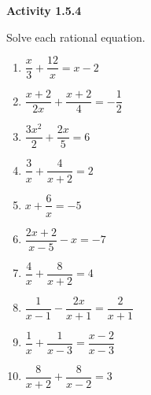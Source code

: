\vspace{1ex}
\noindent\textbf{Activity 1.5.4}

\vspace{0.75ex}

Solve each rational equation. 
\begin{multicols}{2}
\begin{enumerate}[label = \color{blue}\arabic*. ]
\item $ \dfrac{x}{3} + \dfrac{12}{x} = x-2 $

\item $ \dfrac{x+2}{2x} +  \dfrac{x+2}{4} = -\dfrac{1}{2} $

\item $ \dfrac{3x^{2}}{2} +  \dfrac{2x}{5} = 6 $

\item $ \dfrac{3}{x}  + \dfrac{4}{x+2} = 2 $

\item $ x + \dfrac{6}{x} =  -5 $
\item $ \dfrac{2x+2}{x-5} - x = -7 $
\item $ \dfrac{4}{x} + \dfrac{8}{x+2} = 4 $
\item $ \dfrac{1}{x-1} - \dfrac{2x}{x+1} = \dfrac{2}{x+1} $
\item $ \dfrac{1}{x} + \dfrac{1}{x-3} = \dfrac{x-2}{x-3} $
\item $ \dfrac{8}{x+2} + \dfrac{8}{x-2} = 3 $
\end{enumerate}
\end{multicols} 

